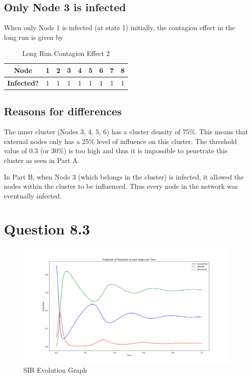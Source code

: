 \documentclass[]{article}
\begin{document}
\subsection*{Only Node 3 is infected}
When only Node 1 is infected (at state 1) initially, the contagion effect in the long run is given by

\begin{table}[htbp]
	\centering
	\caption{Long Run Contagion Effect 2}
	\begin{tabular}{|ccccccccc|}
		\toprule
		\rowcolor[rgb]{ .267,  .447,  .769} \textcolor[rgb]{ 1,  1,  1}{\textbf{Node}} & \textcolor[rgb]{ 1,  1,  1}{\textbf{1}} & \textcolor[rgb]{ 1,  1,  1}{\textbf{2}} & \textcolor[rgb]{ 1,  1,  1}{\textbf{3}} & \textcolor[rgb]{ 1,  1,  1}{\textbf{4}} & \textcolor[rgb]{ 1,  1,  1}{\textbf{5}} & \textcolor[rgb]{ 1,  1,  1}{\textbf{6}} & \textcolor[rgb]{ 1,  1,  1}{\textbf{7}} & \textcolor[rgb]{ 1,  1,  1}{\textbf{8}} \\
		\midrule
		\textbf{Infected?} & 1     & 1     & 1     & 1     & 1     & 1     & 1     & 1 \\
		\bottomrule
	\end{tabular}
	\label{table:contagion_2}
\end{table}

\subsection*{Reasons for differences}

The inner cluster (Nodes 3, 4, 5, 6) has a cluster density of 75\%. This means that external nodes only has a 25\% level of influence on this cluster. The threshold value of 0.3 (or 30\%) is too high and thus it is impossible to penetrate this cluster as seen in Part A.

In Part B, when Node 3 (which belongs in the cluster) is infected, it allowed the nodes within the cluster to be influenced. Thus every node in the network was eventually infected.

\newpage
\section*{Question 8.3}

\begin{figure}[H]
	\includegraphics[width=\linewidth]{8-3.png}
	\caption{SIR Evolution Graph} 
	\label{Q8.3 SIR Graph}
\end{figure}
\end{document}
